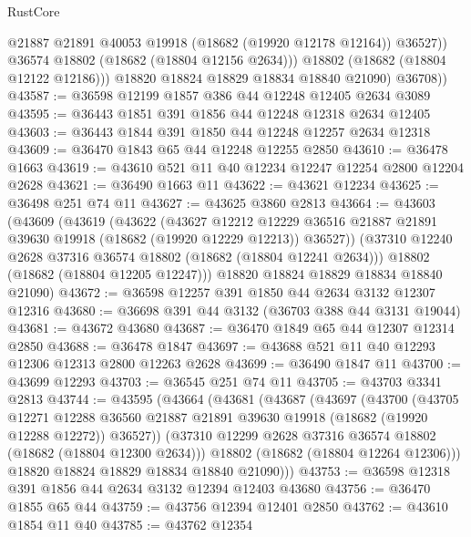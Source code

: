\begin{lexlean}{RustCore}
\begin{coremodule}
                  @21887
                  @21891
                  @40053
                  @19918
                  (@18682 (@19920 @12178 @12164))
                  @36527))
              @36574
              @18802
              (@18682 (@18804 @12156 @2634)))
            @18802
            (@18682 (@18804 @12122 @12186)))
          @18820
          @18824
          @18829
          @18834
          @18840
          @21090)
        @36708))
@43587 := @36598 @12199 @1857 @386 @44 @12248 @12405 @2634 @3089
@43595 := @36443 @1851 @391 @1856 @44 @12248 @12318 @2634 @12405
@43603 := @36443 @1844 @391 @1850 @44 @12248 @12257 @2634 @12318
@43609 := @36470 @1843 @65 @44 @12248 @12255 @2850
@43610 := @36478 @1663
@43619 := @43610 @521 @11 @40 @12234 @12247 @12254 @2800 @12204 @2628
@43621 := @36490 @1663 @11
@43622 := @43621 @12234
@43625 := @36498 @251 @74 @11
@43627 := @43625 @3860 @2813
@43664 := @43603
    (@43609
      (@43619
        (@43622
          (@43627
            @12212
            @12229
            @36516
            @21887
            @21891
            @39630
            @19918
            (@18682 (@19920 @12229 @12213))
            @36527))
        (@37310 @12240 @2628 @37316 @36574 @18802 (@18682 (@18804 @12241 @2634)))
        @18802
        (@18682 (@18804 @12205 @12247)))
      @18820
      @18824
      @18829
      @18834
      @18840
      @21090)
@43672 := @36598 @12257 @391 @1850 @44 @2634 @3132 @12307 @12316
@43680 := @36698 @391 @44 @3132 (@36703 @388 @44 @3131 @19044)
@43681 := @43672 @43680
@43687 := @36470 @1849 @65 @44 @12307 @12314 @2850
@43688 := @36478 @1847
@43697 := @43688 @521 @11 @40 @12293 @12306 @12313 @2800 @12263 @2628
@43699 := @36490 @1847 @11
@43700 := @43699 @12293
@43703 := @36545 @251 @74 @11
@43705 := @43703 @3341 @2813
@43744 := @43595
    (@43664
      (@43681
        (@43687
          (@43697
            (@43700
              (@43705
                @12271
                @12288
                @36560
                @21887
                @21891
                @39630
                @19918
                (@18682 (@19920 @12288 @12272))
                @36527))
            (@37310 @12299 @2628 @37316 @36574 @18802 (@18682 (@18804 @12300 @2634)))
            @18802
            (@18682 (@18804 @12264 @12306)))
          @18820
          @18824
          @18829
          @18834
          @18840
          @21090)))
@43753 := @36598 @12318 @391 @1856 @44 @2634 @3132 @12394 @12403 @43680
@43756 := @36470 @1855 @65 @44
@43759 := @43756 @12394 @12401 @2850
@43762 := @43610 @1854 @11 @40
@43785 := @43762
    @12354

\end{coremodule}
\end{lexlean}
